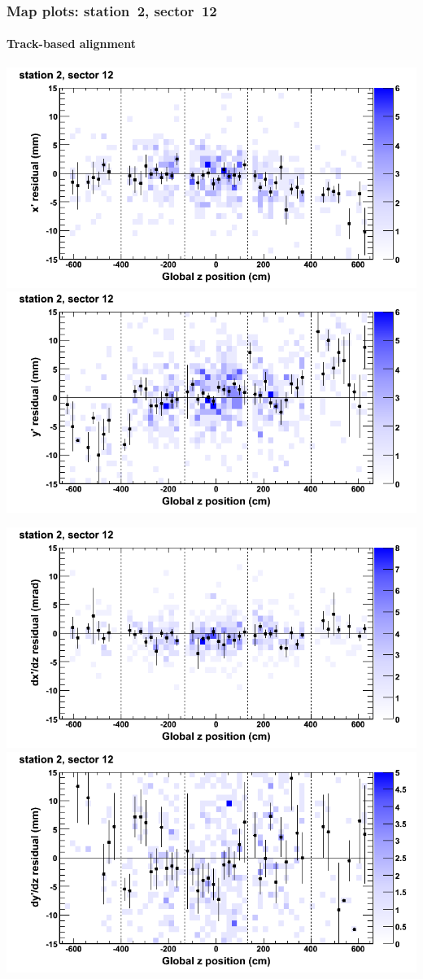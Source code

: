 \documentclass[compress]{beamer}
\begin{document}
\begin{frame}
\frametitle{Map plots: station~2, sector~12}
\framesubtitle{Track-based alignment}
\includegraphics[width=0.5\linewidth]{mapplots_re05/DTvsz_st2sec12_x.png}
\includegraphics[width=0.5\linewidth]{mapplots_re05/DTvsz_st2sec12_y.png}

\includegraphics[width=0.5\linewidth]{mapplots_re05/DTvsz_st2sec12_dxdz.png}
\includegraphics[width=0.5\linewidth]{mapplots_re05/DTvsz_st2sec12_dydz.png}
\end{frame}
\end{document}
